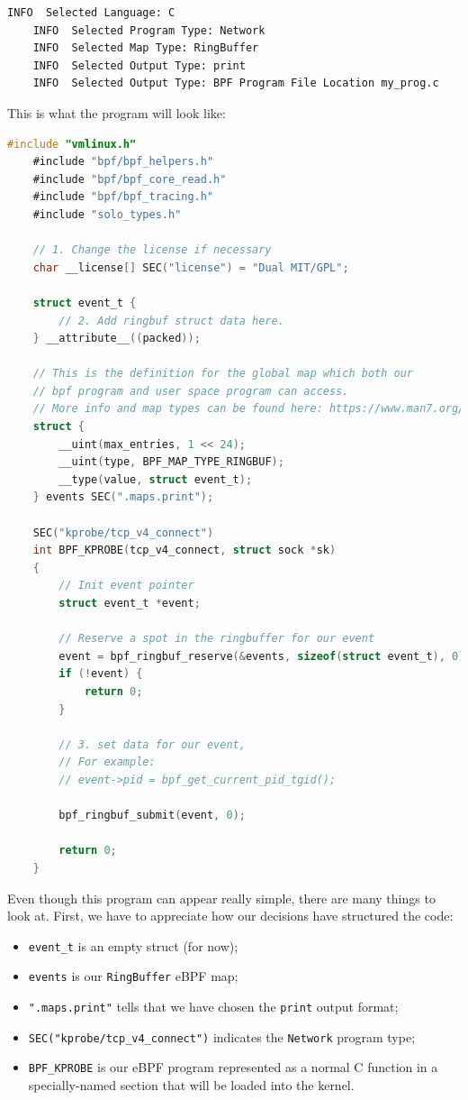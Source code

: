 \begin{lstlisting}[language=bash, caption={bee choices for first program}]
	INFO  Selected Language: C
	INFO  Selected Program Type: Network
	INFO  Selected Map Type: RingBuffer
	INFO  Selected Output Type: print
	INFO  Selected Output Type: BPF Program File Location my_prog.c
\end{lstlisting}

This is what the program will look like:

\begin{lstlisting}[language=C, caption={bee first program}]
	#include "vmlinux.h"
	#include "bpf/bpf_helpers.h"
	#include "bpf/bpf_core_read.h"
	#include "bpf/bpf_tracing.h"
	#include "solo_types.h"
	
	// 1. Change the license if necessary 
	char __license[] SEC("license") = "Dual MIT/GPL";
	
	struct event_t {
		// 2. Add ringbuf struct data here.
	} __attribute__((packed));
	
	// This is the definition for the global map which both our
	// bpf program and user space program can access.
	// More info and map types can be found here: https://www.man7.org/linux/man-pages/man2/bpf.2.html
	struct {
		__uint(max_entries, 1 << 24);
		__uint(type, BPF_MAP_TYPE_RINGBUF);
		__type(value, struct event_t);
	} events SEC(".maps.print");
	
	SEC("kprobe/tcp_v4_connect")
	int BPF_KPROBE(tcp_v4_connect, struct sock *sk)
	{
		// Init event pointer
		struct event_t *event;
		
		// Reserve a spot in the ringbuffer for our event
		event = bpf_ringbuf_reserve(&events, sizeof(struct event_t), 0);
		if (!event) {
			return 0;
		}
		
		// 3. set data for our event,
		// For example:
		// event->pid = bpf_get_current_pid_tgid();
		
		bpf_ringbuf_submit(event, 0);
		
		return 0;
	}
\end{lstlisting}

Even though this program can appear really simple, there are many things to look at.
First, we have to appreciate how our decisions have structured the code:

\begin{itemize}
	\item \verb|event_t| is an empty struct (for now);
	\item \verb|events| is our \verb|RingBuffer| eBPF map;
	\item \verb|".maps.print"| tells that we have chosen the \verb|print| output 
		format;
	\item \verb|SEC("kprobe/tcp_v4_connect")| indicates the \verb|Network| program 
		type;
	\item \verb|BPF_KPROBE| is our eBPF program represented as a normal C function in
		a specially-named section that will be loaded into the kernel.
\end{itemize}

